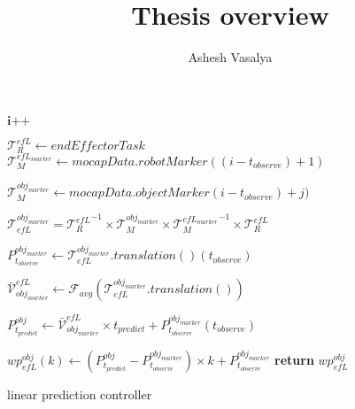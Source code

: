\documentclass{article}
\title{Thesis overview}
\author{Ashesh Vasalya}
\begin{document}
\maketitle

\begin{algorithm}[H]
\DontPrintSemicolon

		
        \textit{$\textbf{i++}$} 
		 
		{
			$\mathcal{T}^{efL}_R\gets \textit{endEffectorTask}$
		 $\mathcal{T}^{efL_{marker}}_M\gets \textit{mocapData}.robotMarker((i-t_{observe})+1)$
		}

		{
		 $\mathcal{T}^{obj_{marker}}_M\gets \textit{mocapData}.objectMarker(i-t_{observe})+j)$	
			
			$\mathcal{T}^{obj_{marker}}_{efL} = {\mathcal{T}^{efL}_R}^{-1} \times  \mathcal{T}^{obj_{marker}}_M \times {\mathcal{T}^{efL_{marker}}_M}^{-1} \times  \mathcal{T}^{efL}_R$	
			
			{
				$P^{obj_{marker}}_{t_{observe}} \gets \mathcal{T}^{obj_{marker}}_{efL}.translation()(t_{observe}) $
			}
		}
		
		$\mathcal{\bar{V}}^{efL}_{obj_{marker}} \gets \mathcal{F}_{avg}(\mathcal{T}^{obj_{marker}}_{efL}.translation())$	\newline 
	

	
		  $P^{obj}_{t_{predict}} \gets \mathcal{\bar{V}}^{efL}_{obj_{marker}}\times t_{predict}  +{P^{obj_{marker}}_{t_{observe}}(t_{observe})}$ \newline %
		


	{
		{
			$wp^{obj}_{efL}(k) \gets (P^{obj}_{t_{predict}} - P^{obj_{marker}}_{t_{observe}}) \times k  +  P^{obj_{marker}}_{t_{observe}} $ 
		}	
		\textbf{return} $ wp^{obj}_{efL} $
	}

\caption{linear prediction controller}
\end{algorithm}
\end{document}
